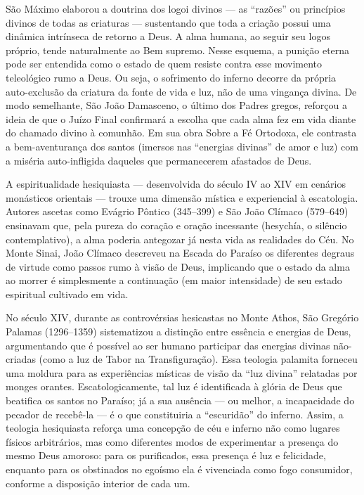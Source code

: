 São Máximo elaborou a doutrina dos logoi divinos --- as “razões” ou princípios divinos de todas as criaturas --- sustentando que toda a criação possui uma dinâmica intrínseca de retorno a Deus. A alma humana, ao seguir seu logos próprio, tende naturalmente ao Bem supremo. Nesse esquema, a punição eterna pode ser entendida como o estado de quem resiste contra esse movimento teleológico rumo a Deus. Ou seja, o sofrimento do inferno decorre da própria auto-exclusão da criatura da fonte de vida e luz, não de uma vingança divina. De modo semelhante, São João Damasceno, o último dos Padres gregos, reforçou a ideia de que o Juízo Final confirmará a escolha que cada alma fez em vida diante do chamado divino à comunhão. Em sua obra Sobre a Fé Ortodoxa, ele contrasta a bem-aventurança dos santos (imersos nas “energias divinas” de amor e luz) com a miséria auto-infligida daqueles que permanecerem afastados de Deus.




A espiritualidade hesiquiasta --- desenvolvida do século IV ao XIV em cenários monásticos orientais --- trouxe uma dimensão mística e experiencial à escatologia. Autores ascetas como Evágrio Pôntico (345--399) e São João Clímaco (579--649) ensinavam que, pela pureza do coração e oração incessante (hesychía, o silêncio contemplativo), a alma poderia antegozar já nesta vida as realidades do Céu. No Monte Sinai, João Clímaco descreveu na Escada do Paraíso os diferentes degraus de virtude como passos rumo à visão de Deus, implicando que o estado da alma ao morrer é simplesmente a continuação (em maior intensidade) de seu estado espiritual cultivado em vida.

No século XIV, durante as controvérsias hesicastas no Monte Athos, São Gregório Palamas (1296--1359) sistematizou a distinção entre essência e energias de Deus, argumentando que é possível ao ser humano participar das energias divinas não-criadas (como a luz de Tabor na Transfiguração). Essa teologia palamita forneceu uma moldura para as experiências místicas de visão da “luz divina” relatadas por monges orantes. Escatologicamente, tal luz é identificada à glória de Deus que beatifica os santos no Paraíso; já a sua ausência --- ou melhor, a incapacidade do pecador de recebê-la --- é o que constituiria a “escuridão” do inferno. Assim, a teologia hesiquiasta reforça uma concepção de céu e inferno não como lugares físicos arbitrários, mas como diferentes modos de experimentar a presença do mesmo Deus amoroso: para os purificados, essa presença é luz e felicidade, enquanto para os obstinados no egoísmo ela é vivenciada como fogo consumidor, conforme a disposição interior de cada um.

